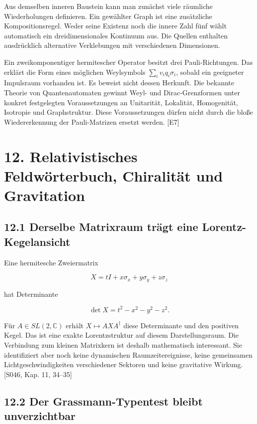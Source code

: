 Aus demselben inneren Baustein kann man zunächst viele räumliche
Wiederholungen definieren. Ein gewählter Graph ist eine zusätzliche
Kompositionsregel. Weder seine Existenz noch die innere Zahl fünf wählt
automatisch ein dreidimensionales Kontinuum aus. Die Quellen enthalten
ausdrücklich alternative Verklebungen mit verschiedenen Dimensionen.

Ein zweikomponentiger hermitescher Operator besitzt drei
Pauli-Richtungen. Das erklärt die Form eines möglichen Weylsymbols
\(\sum_i v_iq_i\sigma_i\), sobald ein geeigneter Impulsraum vorhanden
ist. Es beweist nicht dessen Herkunft. Die bekannte Theorie von
Quantenautomaten gewinnt Weyl- und Dirac-Grenzformen unter konkret
festgelegten Voraussetzungen an Unitarität, Lokalität, Homogenität,
Isotropie und Graphstruktur. Diese Voraussetzungen dürfen nicht durch
die bloße Wiedererkennung der Pauli-Matrizen ersetzt werden. {[}E7{]}

\section{12. Relativistisches Feldwörterbuch, Chiralität und
Gravitation}\label{relativistisches-feldwuxf6rterbuch-chiralituxe4t-und-gravitation}

\subsection{12.1 Derselbe Matrixraum trägt eine
Lorentz-Kegelansicht}\label{derselbe-matrixraum-truxe4gt-eine-lorentz-kegelansicht}

Eine hermitesche Zweiermatrix

\[X=tI+x\sigma_x+y\sigma_y+z\sigma_z\]

hat Determinante

\[\det X=t^2-x^2-y^2-z^2.\]

Für \(A\in SL(2,\mathbb C)\) erhält \(X\mapsto AXA^\dagger\) diese
Determinante und den positiven Kegel. Das ist eine exakte
Lorentzstruktur auf diesem Darstellungsraum. Die Verbindung zum kleinen
Matrixkern ist deshalb mathematisch interessant. Sie identifiziert aber
noch keine dynamischen Raumzeitereignisse, keine gemeinsamen
Lichtgeschwindigkeiten verschiedener Sektoren und keine gravitative
Wirkung. {[}S046, Kap. 11, 34--35{]}

\subsection{12.2 Der Grassmann-Typentest bleibt
unverzichtbar}\label{der-grassmann-typentest-bleibt-unverzichtbar}

